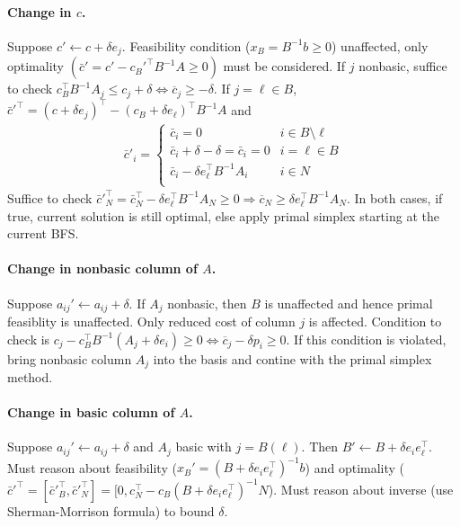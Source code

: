 \documentclass{article}
\begin{document}
\paragraph{Change in $c$.} Suppose $c'\leftarrow c + \delta e_j$. Feasibility condition ($x_B = B^{-1}b \geq 0$) unaffected, only optimality $(\bar c' = c' - c_B'^{\top}B^{-1}A \geq 0)$ must be considered. If $j$ nonbasic, suffice to check $c_B^\top B^{-1}A_j \leq c_j + \delta \iff \overline c_j \geq -\delta$. If $j = \ell\in B$, $\bar c'^\top = (c + \delta e_j)^\top - (c_B + \delta e_\ell)^\top B^{-1}A$ and 
\begin{align*}
    \bar c'_i = \begin{cases}
        \bar c_i = 0 & i\in B\setminus \ell\\
        \bar c_i + \delta - \delta = \bar c_i = 0 & i = \ell\in B\\
        \bar c_i - \delta e_\ell^\top B^{-1}A_i & i \in N\\
    \end{cases}
\end{align*}
Suffice to check $\bar c'^\top_N = \bar c_N^\top - \delta e_\ell^\top B^{-1}A_N \geq 0 \Longrightarrow \overline c_N \geq \delta e_\ell^\top  B^{-1}A_N$. In both cases, if true, current solution is still optimal, else apply primal simplex starting at the current BFS. 

\paragraph{Change in nonbasic column of $A$.} Suppose $a_{ij}'\leftarrow a_{ij} + \delta$. If $A_j$ nonbasic, then $B$ is unaffected and hence primal feasiblity is unaffected. Only reduced cost of column $j$ is affected. Condition to check is $c_j - c_B^\top B^{-1}(A_j + \delta e_i)\geq 0 \iff \overline c_j - \delta p_i \geq 0$. If this condition is violated, bring nonbasic column $A_j$ into the basis and contine with the primal simplex method. 

\paragraph{Change in basic column of $A$.} Suppose $a_{ij}'\leftarrow a_{ij} + \delta$ and $A_j$ basic with $j=B(\ell)$. Then $B' \leftarrow B + \delta e_i e_\ell^\top$. Must reason about feasibility ($x_B' = (B + \delta e_i e_\ell^\top)^{-1}b$) and optimality ($\bar c'^\top = [\bar c'^\top_B, \bar c'^\top_N]= [0, c_N^\top - c_B(B + \delta e_i e_\ell^\top)^{-1}N$). Must reason about inverse (use Sherman-Morrison formula) to bound $\delta$.
\end{document}
